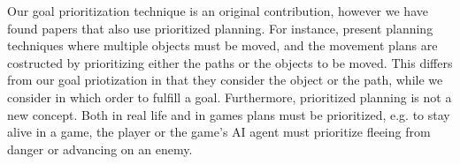 Our goal prioritization technique is an original contribution, however we have found papers that also use prioritized planning.
For instance, \cite{van2005prioritized,bennewitz2001optimizing,erdmann1987multiple} present planning techniques where multiple objects must be moved, and the movement plans are costructed by prioritizing either the paths or the objects to be moved.
This differs from our goal priotization in that they consider the object or the path, while we consider in which order to fulfill a goal.
Furthermore, prioritized planning is not a new concept.
Both in real life and in games plans must be prioritized, e.g. to stay alive in a game, the player or the game's AI agent must prioritize fleeing from danger or advancing on an enemy.~\cite{orkin2006three}
